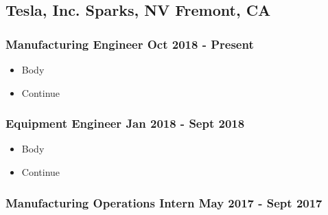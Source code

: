 \documentclass{article}
\newenvironment{mytemize}			%
{
\begin{itemize}[leftmargin=*]			%

	\setlength\itemsep{-0.25em}		%
	
}
{\end{itemize}}
\begin{document}



\subsection{\textbf{Tesla, Inc.} \hfill Sparks, NV \textbar \hspace{0.1em} Fremont, CA}

\vspace{-0.45em}
\subsubsection{Manufacturing Engineer \hfill Oct 2018 - Present}

\vspace{-0.25em}
\begin{mytemize}

	\item Body
	\item Continue

\end{mytemize}


\vspace{-2em}				%
\subsubsection{Equipment Engineer \hfill Jan 2018 - Sept 2018}

\vspace{-0.25em}
\begin{mytemize}

	\item Body
	\item Continue

\end{mytemize}


\vspace{-2em}				%
\subsubsection{Manufacturing Operations Intern \hfill May 2017 - Sept 2017}
\end{document}
